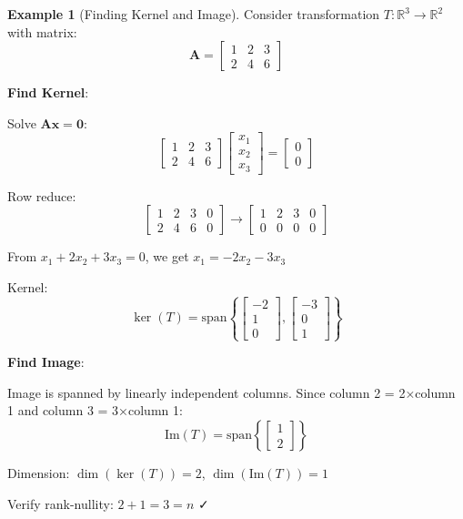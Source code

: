 \documentclass[12pt,a4paper]{article}
\theoremstyle{definition}
\newtheorem{example}{Example}[section]
\begin{document}
\begin{example}[Finding Kernel and Image]
Consider transformation $T: \mathbb{R}^3 \rightarrow \mathbb{R}^2$ with matrix:
\[
\mathbf{A} = \begin{bmatrix}
1 & 2 & 3 \\
2 & 4 & 6
\end{bmatrix}
\]

\textbf{Find Kernel}:

Solve $\mathbf{Ax} = \mathbf{0}$:
\[
\begin{bmatrix}
1 & 2 & 3 \\
2 & 4 & 6
\end{bmatrix}
\begin{bmatrix}
x_1 \\ x_2 \\ x_3
\end{bmatrix}
= \begin{bmatrix}
0 \\ 0
\end{bmatrix}
\]

Row reduce:
\[
\left[\begin{array}{ccc|c}
1 & 2 & 3 & 0 \\
2 & 4 & 6 & 0
\end{array}\right]
\rightarrow
\left[\begin{array}{ccc|c}
1 & 2 & 3 & 0 \\
0 & 0 & 0 & 0
\end{array}\right]
\]

From $x_1 + 2x_2 + 3x_3 = 0$, we get $x_1 = -2x_2 - 3x_3$

Kernel:
\[
\ker(T) = \text{span}\left\{\begin{bmatrix} -2 \\ 1 \\ 0 \end{bmatrix}, \begin{bmatrix} -3 \\ 0 \\ 1 \end{bmatrix}\right\}
\]

\textbf{Find Image}:

Image is spanned by linearly independent columns. Since column 2 = 2×column 1 and column 3 = 3×column 1:
\[
\text{Im}(T) = \text{span}\left\{\begin{bmatrix} 1 \\ 2 \end{bmatrix}\right\}
\]

Dimension: $\dim(\ker(T)) = 2$, $\dim(\text{Im}(T)) = 1$

Verify rank-nullity: $2 + 1 = 3 = n$ ✓
\end{example}
\end{document}
